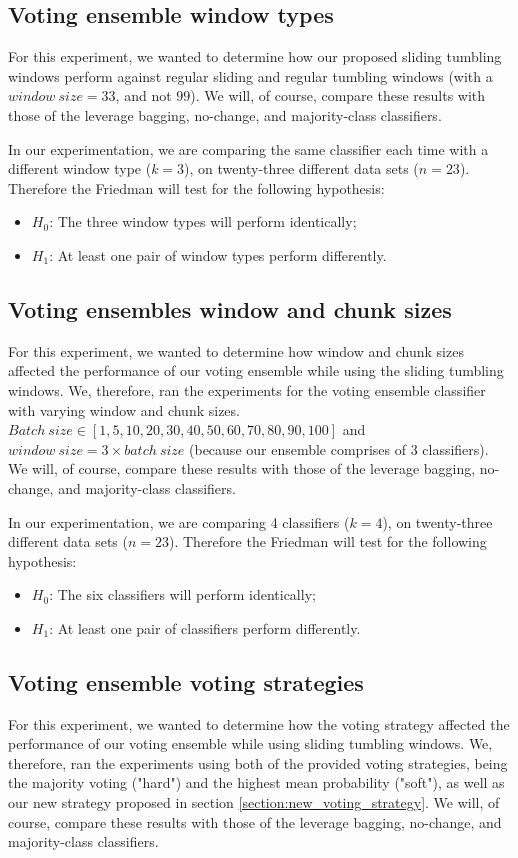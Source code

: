 \subsection{Voting ensemble window types}
For this experiment, we wanted to determine how our proposed sliding tumbling windows perform against regular sliding and regular tumbling windows (with a $window\ size=33$, and not $99$).
We will, of course,  compare these results with those of the leverage bagging, no-change, and majority-class classifiers.

In our experimentation, we are comparing the same classifier each time with a different window type ($k=3$), on twenty-three different data sets ($n=23$). Therefore the Friedman will test for the following hypothesis:
\begin{itemize}
\item $H_0$: The three window types will perform identically;
\item $H_1$: At least one pair of window types perform differently.
\end{itemize}

\subsection{Voting ensembles window and chunk sizes}
For this experiment, we wanted to determine how window and chunk sizes affected the performance of our voting ensemble while using the sliding tumbling windows. We, therefore, ran the experiments for the voting ensemble classifier with varying window and chunk sizes. $Batch\ size \in [1, 5, 10, 20, 30, 40, 50, 60, 70, 80, 90, 100]$ and $window\ size = 3\times batch\ size$ (because our ensemble comprises of 3 classifiers).
We will, of course, compare these results with those of the leverage bagging, no-change, and majority-class classifiers.

In our experimentation, we are comparing 4 classifiers ($k=4$), on twenty-three different data sets ($n=23$). Therefore the Friedman will test for the following hypothesis:
\begin{itemize}
\item $H_0$: The six classifiers will perform identically;
\item $H_1$: At least one pair of classifiers perform differently.
\end{itemize}

\subsection{Voting ensemble voting strategies}
For this experiment, we wanted to determine how the voting strategy affected the performance of our voting ensemble while using sliding tumbling windows. We, therefore, ran the experiments using both of the provided voting strategies, being the majority voting ("hard") and the highest mean probability ("soft"), as well as our new strategy proposed in section \ref{section:new_voting_strategy}.
We will, of course, compare these results with those of the leverage bagging, no-change, and majority-class classifiers.

